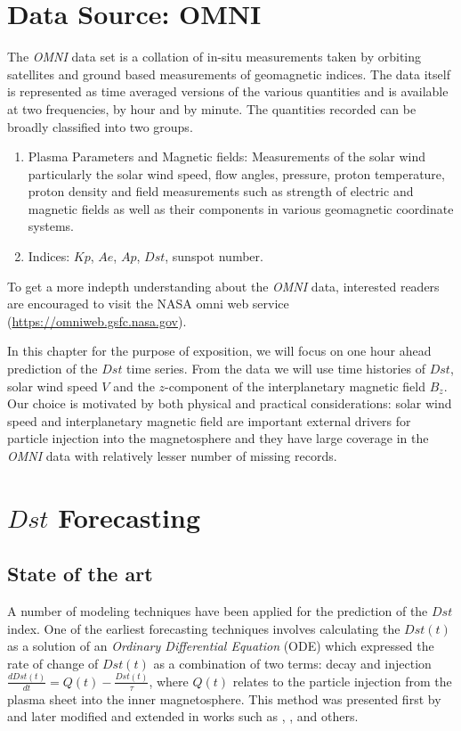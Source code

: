 \documentclass{article}
\begin{document}
\section{Data Source: OMNI}
The \emph{OMNI} data set is a collation of in-situ measurements taken by orbiting satellites and ground based measurements of geomagnetic indices. The data itself is represented as time averaged versions of the various quantities and is available at two frequencies, by hour and by minute. The quantities recorded can be broadly classified into two groups.

\begin{enumerate}

  \item Plasma Parameters and Magnetic fields: Measurements of the solar wind particularly the solar wind speed, flow angles, pressure, proton temperature, proton density and field measurements such as strength of electric and magnetic fields as well as their components in various geomagnetic coordinate systems.

  \item Indices: $Kp$, $Ae$, $Ap$, $Dst$, sunspot number.

\end{enumerate}

To get a more indepth understanding about the \emph{OMNI} data, interested readers are encouraged to visit the NASA omni web service (\url{https://omniweb.gsfc.nasa.gov}).

In this chapter for the purpose of exposition, we will focus on one hour ahead prediction of the $Dst$ time series. From the data we will use time histories of $Dst$, solar wind speed $V$ and the $z$-component of the interplanetary magnetic field $B_z$. Our choice is motivated by both physical and practical considerations: solar wind speed and interplanetary magnetic field are important external drivers for particle injection into the magnetosphere and they have large coverage in the \emph{OMNI} data with relatively lesser number of missing records.

\section{$Dst$ Forecasting}

\subsection{State of the art}

A number of modeling techniques have been applied for the prediction of the $Dst$ index. One of the earliest forecasting techniques involves calculating the $Dst(t)$ as a solution of an \emph{Ordinary Differential Equation} (ODE) which expressed the rate of change of $Dst(t)$ as a combination of two terms: decay and injection $\frac{d Dst(t)}{dt} = Q(t) - \frac{Dst(t)}{\tau}$, where $Q(t)$ relates to the particle injection from the plasma sheet into the inner magnetosphere. This method was presented first by \citet{JGR:JGR10260} and later modified and extended in works such as \citet{Wang:Dst}, \citet{JGRA:JGRA14856}, \citet{Ballatore2014} and others.
\end{document}
